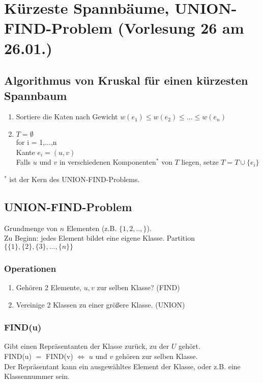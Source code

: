 \section{ Kürzeste Spannbäume, UNION-FIND-Problem \tiny (Vorlesung 26 am 26.01.)}

\subsection{Algorithmus von Kruskal für einen kürzesten Spannbaum}

\begin{enumerate}
\item Sortiere die Katen nach Gewicht $w(e_1) \leq w(e_2) \leq ... \leq w(e_n)$
\item $T = \emptyset$\\
for i = 1,...,n\\
	Kante $e_i = (u,v)$\\
	Falls $u$ und $v$ in verschiedenen Komponenten$^*$ von $T$ liegen, setze $T = T \cup \{e_i\}$
\end{enumerate}

$^*$ ist der Kern des UNION-FIND-Problems.

\subsection{UNION-FIND-Problem}
Grundmenge von $n$ Elementen (z.B. $\{1,2,..,\}$).\\
Zu Beginn: jedes Element bildet eine eigene Klasse. Partition $\{\{1\},\{2\},\{3\},...,\{n\}\}$\\
\subsubsection{Operationen}
\begin{enumerate}
\item Gehören 2 Elemente, $u,v$ zur selben Klasse? (FIND)
\item Vereinige 2 Klassen zu einer größere Klasse. (UNION)
\end{enumerate}
\subsubsection{FIND(u)}
Gibt einen Repräsentanten der Klasse zurück, zu der $U$ gehört.\\
FIND(u) $=$ FIND(v) $\Leftrightarrow$ $u$ und $v$ gehören zur selben Klasse.\\
Der Repräsentant kann ein ausgewähltes Element der Klasse, oder z.B. eine Klassennummer sein.
